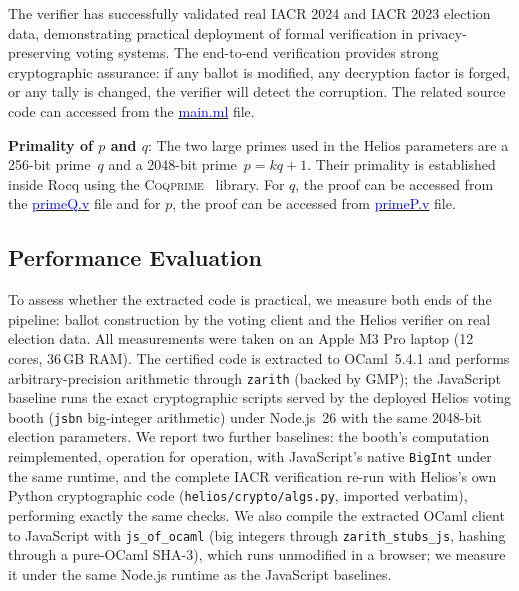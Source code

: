 \documentclass[sigconf,anonymous,review]{acmart}
\begin{document}
The verifier has successfully validated real IACR 2024 and IACR 2023 election data, demonstrating practical deployment 
of formal verification in privacy-preserving voting systems. The end-to-end verification provides strong 
cryptographic assurance: if any ballot is modified, any decryption factor is forged, or any tally is 
changed, the verifier will detect the corruption. The related source code can accessed 
from the \href{https://anonymous.4open.science/r/SigmaProtocol-EBA5/src/Executable/HeliosVerifiercode/main.ml}{\textcolor{blue}{main.ml}} file.


\textbf{Primality of $p$ and $q$}:
The two large primes used in the Helios parameters are a 256-bit prime~$q$
and a 2048-bit prime~$p = kq + 1$.
Their primality is established inside Rocq using the
\textsc{Coqprime}~\cite{thery2007primality} library.  For $q$, the proof can be accessed from the \href{https://anonymous.4open.science/r/SigmaProtocol-EBA5/src/Examples/primeQ.v}{\textcolor{blue}{primeQ.v}} file and 
for $p$, the proof can be accessed from \href{https://anonymous.4open.science/r/SigmaProtocol-EBA5/src/Examples/primeP.v}{\textcolor{blue}{primeP.v}} file.  



  


\subsection{Performance Evaluation}\label{perf_eval}
To assess whether the extracted code is practical, we measure both ends of the pipeline: ballot construction by the voting client and the Helios verifier on real election data. All measurements were taken on an Apple M3 Pro laptop (12 cores, 36\,GB RAM). The certified code is extracted to OCaml~5.4.1 and performs arbitrary-precision arithmetic through \texttt{zarith} (backed by GMP); the JavaScript baseline runs the exact cryptographic scripts served by the deployed Helios voting booth (\texttt{jsbn} big-integer arithmetic) under Node.js~26 with the same 2048-bit election parameters. We report two further baselines: the booth's computation reimplemented, operation for operation, with JavaScript's native \texttt{BigInt} under the same runtime, and the complete IACR verification re-run with Helios's own Python cryptographic code (\texttt{helios/crypto/algs.py}, imported verbatim), performing exactly the same checks. We also compile the extracted OCaml client to JavaScript with \texttt{js\_of\_ocaml} (big integers through \texttt{zarith\_stubs\_js}, hashing through a pure-OCaml SHA-3), which runs unmodified in a browser; we measure it under the same Node.js runtime as the JavaScript baselines.
\end{document}
